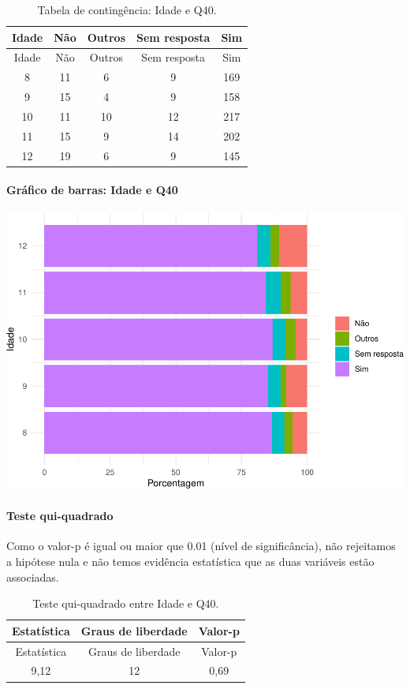 \documentclass[]{article}
\let\oldparagraph\paragraph
\renewcommand{\paragraph}[1]{\oldparagraph{#1}\mbox{}}
\begin{document}
\begin{longtable}[]{@{}ccccc@{}}
\caption{\label{tab:unnamed-chunk-1567}Tabela de contingência: Idade e Q40.}\tabularnewline
\toprule
Idade & Não & Outros & Sem resposta & Sim\tabularnewline
\midrule
\endfirsthead
\toprule
Idade & Não & Outros & Sem resposta & Sim\tabularnewline
\midrule
\endhead
8 & 11 & 6 & 9 & 169\tabularnewline
9 & 15 & 4 & 9 & 158\tabularnewline
10 & 11 & 10 & 12 & 217\tabularnewline
11 & 15 & 9 & 14 & 202\tabularnewline
12 & 19 & 6 & 9 & 145\tabularnewline
\bottomrule
\end{longtable}

\hypertarget{gruxe1fico-de-barras-idade-e-q40}{%
\paragraph{Gráfico de barras: Idade e Q40}\label{gruxe1fico-de-barras-idade-e-q40}}

\begin{center}\includegraphics[width=0.75\linewidth]{relatorio_covid19_files/figure-latex/unnamed-chunk-1568-1} \end{center}

\hypertarget{teste-qui-quadrado-134}{%
\paragraph{Teste qui-quadrado}\label{teste-qui-quadrado-134}}

Como o valor-p é igual ou maior que 0.01 (nível de significância), não rejeitamos a hipótese nula e não temos evidência estatística que as duas variáveis estão associadas.

\begin{longtable}[]{@{}ccc@{}}
\caption{\label{tab:unnamed-chunk-1570}Teste qui-quadrado entre Idade e Q40.}\tabularnewline
\toprule
Estatística & Graus de liberdade & Valor-p\tabularnewline
\midrule
\endfirsthead
\toprule
Estatística & Graus de liberdade & Valor-p\tabularnewline
\midrule
\endhead
9,12 & 12 & 0,69\tabularnewline
\bottomrule
\end{longtable}
\end{document}
